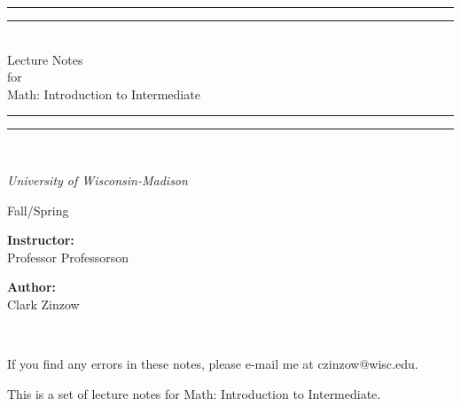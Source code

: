 \documentclass[twoside, titlepage]{amsart}
\makeatletter
\newcommand{\authorName}{Clark Zinzow}  %
\newcommand{\subject}{Math}  %
\newcommand{\courseNumber}{999}  %
\newcommand{\courseName}{Introduction to Intermediate}  %
\newcommand{\instName}{Professor Professorson}  %
\newcommand{\semester}{Fall/Spring \the\year}  %
\newcommand{\universityName}{University of Wisconsin-Madison}  %
\newcommand{\authorEmail}{czinzow@wisc.edu}  %
\theoremstyle{plain} %
\theoremstyle{definition}
\theoremstyle{remark}
\theoremstyle{notation}
\makeatother
\begin{document}
	
\begin{titlepage}
	\centering
	\vspace*{\baselineskip}
	\rule{\textwidth}{1.6pt}\vspace*{-\baselineskip}\vspace*{2pt}
	\rule{\textwidth}{0.4pt}\\[\baselineskip]
	{\Huge Lecture Notes\\ for \\[0.4\baselineskip]
		\subject\:\courseNumber: \courseName
	}\\[0.2\baselineskip]
	\rule{\textwidth}{0.4pt}\vspace*{-\baselineskip}\vspace*{3pt}
	\rule{\textwidth}{1.6pt}\\[\baselineskip]
	\vspace*{3\baselineskip}
	\huge {\itshape \universityName \par}
	\vspace*{\baselineskip}
	\semester \par
	\vspace*{3\baselineskip}
	\begin{minipage}{0.4\textwidth}
		\begin{flushleft}
			\begin{center}
				\huge \textbf{Instructor:}  \\[\baselineskip]
				{ \instName}	
			\end{center}		
		\end{flushleft}
	\end{minipage}
	\begin{minipage}{0.4\textwidth}
		\begin{flushright}
			\begin{center}
				\huge \textbf{Author:} \\[\baselineskip]
				{ \authorName}
			\end{center}
		\end{flushright}
	\end{minipage}\\
	\vfill
	{ If you find any errors in these notes, please e-mail me at \authorEmail. \par}
\end{titlepage}

This is a set of lecture notes for \subject\:\courseNumber: \courseName.
\hspace{0pt} \\
\end{document}
